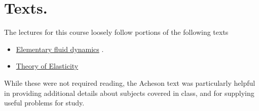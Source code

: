 \section{Texts.}

The lectures for this course loosely follow portions of the following texts

\begin{itemize}
\item \href{http://www.amazon.com/Elementary-Dynamics-Applied-Mathematics-Computing/dp/0198596790/ref=sr_1_1?ie=UTF8&qid=1326302753&sr=8-1}{Elementary fluid dynamics} \cite{acheson1990elementary}.
\item \href{http://www.amazon.com/Theory-Elasticity-Third-Theoretical-Physics/dp/075062633X/ref=sr_1_6?s=books&ie=UTF8&qid=1326302957&sr=1-6}{Theory of Elasticity} \cite{landau1960theory}
\end{itemize}

While these were not required reading, the Acheson text was particularly helpful in providing additional details about subjects covered in class, and for supplying useful problems for study.

